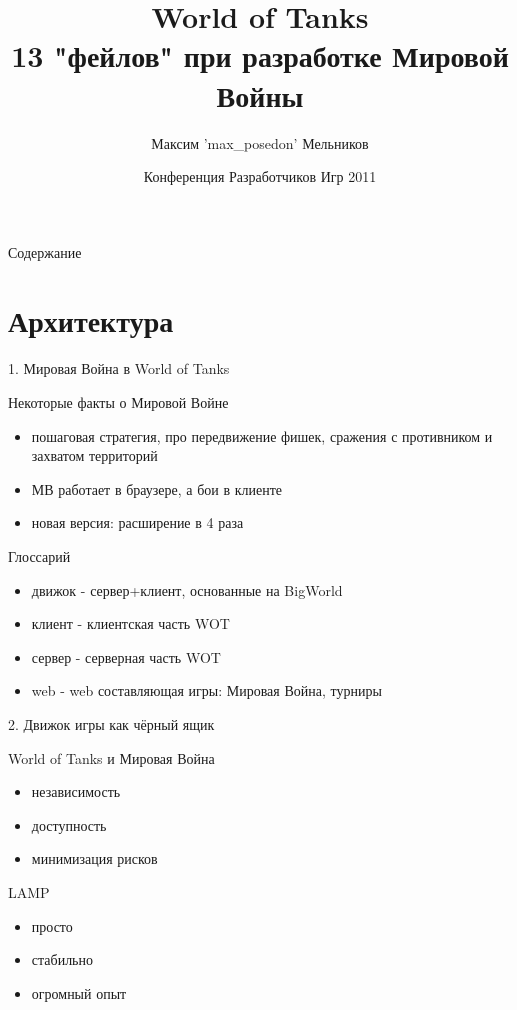 \documentclass{beamer}
\title[World of Tanks: Мировая Война]{World of Tanks\\13 "фейлов" при разработке Мировой Войны}
\author{Максим 'max\_posedon' Мельников}
\institute{Wargaming.net}
\date[КРИ 2011]{Конференция Разработчиков Игр 2011}
\begin{document}
\begin{frame}
  \titlepage
\end{frame}

\begin{frame}{Содержание}
  \tableofcontents
\end{frame}

\section{Архитектура}
\begin{frame}{1. Мировая Война в World of Tanks}
    \begin{block}{Некоторые факты о Мировой Войне}
        \begin{itemize}
            \item{пошаговая стратегия, про передвижение фишек, сражения с противником и захватом территорий}
            \item{МВ работает в браузере, а бои в клиенте}
            \item{новая версия: расширение в 4 раза}
        \end{itemize}
    \end{block}

    \pause
    \begin{block}{Глоссарий}
        \begin{itemize}
            \item{движок - сервер+клиент, основанные на BigWorld}
            \item{клиент - клиентская часть WOT}
            \item{сервер - серверная часть WOT}
            \item{web - web составляющая игры: Мировая Война, турниры}
        \end{itemize}
    \end{block}
\end{frame}

\begin{frame}{2. Движок игры как чёрный ящик}
    \begin{block}{World of Tanks и Мировая Война}
        \begin{itemize}
            \item{независимость}
            \item{доступность}
            \item{минимизация рисков}
        \end{itemize}
    \end{block}
     
    \pause
    \begin{block}{LAMP}
        \begin{itemize}
            \item просто
            \item стабильно
            \item огромный опыт
        \end{itemize}
    \end{block}
\end{frame}
\end{document}
